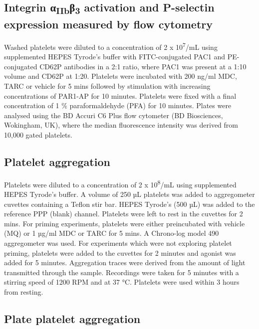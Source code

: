 \documentclass[11pt,twoside]{bristolthesis}
\begin{document}
\hypertarget{integrin-ux3b1iibux3b23-activation-and-p-selectin-expression-measured-by-flow-cytometry-1}{%
\subsection{\texorpdfstring{Integrin α\textsubscript{IIb}β\textsubscript{3} activation and P-selectin expression measured by flow cytometry}{Integrin αIIbβ3 activation and P-selectin expression measured by flow cytometry}}\label{integrin-ux3b1iibux3b23-activation-and-p-selectin-expression-measured-by-flow-cytometry-1}}

Washed platelets were diluted to a concentration of 2 x 10\textsuperscript{7}/mL using supplemented HEPES Tyrode's buffer with FITC-conjugated PAC1 and PE-conjugated CD62P antibodies in a 2:1 ratio, where PAC1 was present at a 1:10 volume and CD62P at 1:20. Platelets were incubated with 200 ng/ml MDC, TARC or vehicle for 5 mins followed by stimulation with increasing concentrations of PAR1-AP for 10 minutes. Platelets were fixed with a final concentration of 1 \% paraformaldehyde (PFA) for 10 minutes. Plates were analysed using the BD Accuri C6 Plus flow cytometer (BD Biosciences, Wokingham, UK), where the median fluorescence intensity was derived from 10,000 gated platelets.

\hypertarget{platelet-aggregation}{%
\subsection{Platelet aggregation}\label{platelet-aggregation}}

Platelets were diluted to a concentration of 2 x 10\textsuperscript{8}/mL using supplemented HEPES Tyrode's buffer. A volume of 250 µL platelets was added to aggregometer cuvettes containing a Teflon stir bar. HEPES Tyrode's (500 µL) was added to the reference PPP (blank) channel. Platelets were left to rest in the cuvettes for 2 mins. For priming experiments, platelets were either preincubated with vehicle (MQ) or 1 µg/ml MDC or TARC for 5 mins. A Chrono-log model 490 aggregometer was used. For experiments which were not exploring platelet priming, platelets were added to the cuvettes for 2 minutes and agonist was added for 5 minutes. Aggregation traces were derived from the amount of light transmitted through the sample. Recordings were taken for 5 minutes with a stirring speed of 1200 RPM and at 37 °C. Platelets were used within 3 hours from resting.

\hypertarget{plate-platelet-aggregation}{%
\subsection{Plate platelet aggregation}\label{plate-platelet-aggregation}}
\end{document}
